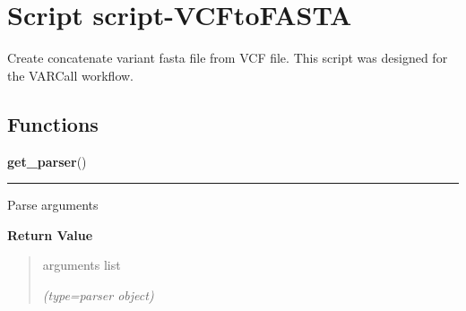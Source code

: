 %
%
%


\section{Script script-VCFtoFASTA}

    \label{script-VCFtoFASTA}
Create concatenate variant fasta file from VCF file. This script was 
designed for the VARCall workflow.



  \subsection{Functions}

    \label{script-VCFtoFASTA:get_parser}

    \vspace{0.5ex}

\hspace{.8\funcindent}\begin{boxedminipage}{\funcwidth}

    \raggedright \textbf{get\_parser}()

    \vspace{-1.5ex}

    \rule{\textwidth}{0.5\fboxrule}
\setlength{\parskip}{2ex}
    Parse arguments

\setlength{\parskip}{1ex}
      \textbf{Return Value}
    \vspace{-1ex}

      \begin{quote}
      arguments list

      {\it (type=parser object)}

      \end{quote}

    \end{boxedminipage}

